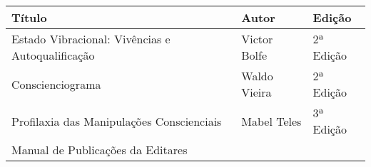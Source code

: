 \documentclass{gescons}
\begin{document}
\begin{longtable}[]{@{}
  >{\raggedright\arraybackslash}p{}
  >{\raggedright\arraybackslash}p{}
  >{\raggedright\arraybackslash}p{}@{}}
\toprule\noalign{}
\begin{minipage}[b]{\linewidth}\centering
\textbf{Título}
\end{minipage} & \begin{minipage}[b]{\linewidth}\centering
\textbf{Autor}
\end{minipage} & \begin{minipage}[b]{\linewidth}\centering
\textbf{Edição}
\end{minipage} \\
\hline
\begin{minipage}[b]{\linewidth}\raggedright
Estado Vibracional: Vivências e Autoqualificação
\end{minipage} & \begin{minipage}[b]{\linewidth}\raggedright
Victor Bolfe
\end{minipage} & \begin{minipage}[b]{\linewidth}\raggedright
2ª Edição
\end{minipage} \\
\hline
\begin{minipage}[b]{\linewidth}\raggedright
Conscienciograma
\end{minipage} & \begin{minipage}[b]{\linewidth}\raggedright
Waldo Vieira
\end{minipage} & \begin{minipage}[b]{\linewidth}\raggedright
2ª Edição
\end{minipage} \\
\hline
\begin{minipage}[b]{\linewidth}\raggedright
Profilaxia das Manipulações Conscienciais
\end{minipage} & \begin{minipage}[b]{\linewidth}\raggedright
Mabel Teles
\end{minipage} & \begin{minipage}[b]{\linewidth}\raggedright
3ª Edição
\end{minipage} \\
\hline
\begin{minipage}[b]{\linewidth}\raggedright
Manual de Publicações da Editares
\end{minipage} & \begin{minipage}[b]{\linewidth}\raggedright

\end{minipage}
\end{longtable}
\end{document}
